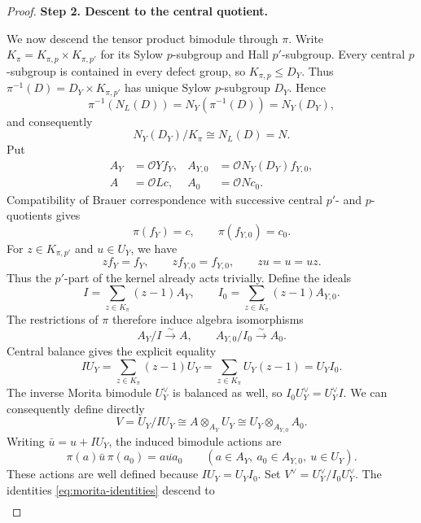 \documentclass[11pt,a4paper]{article}
\theoremstyle{definition}
\theoremstyle{remark}
\numberwithin{equation}{section}
\newcommand{\cO}{\mathcal{O}}
\newcommand{\proofstep}[1]{%
	\par\addvspace{\medskipamount}%
	\noindent\textbf{#1}\par\nobreak
	\smallskip\nobreak\noindent\ignorespaces
}
\begin{document}
\begin{proof}
		\proofstep{Step 2. Descent to the central quotient.}
		We now descend the tensor product bimodule through $\pi$.
		Write $K_\pi=K_{\pi,p}\times K_{\pi,p'}$ for its Sylow
		$p$-subgroup and Hall $p'$-subgroup. Every central $p$-subgroup
		is contained in every defect group, so $K_{\pi,p}\leq D_Y$.
		Thus $\pi^{-1}(D)=D_Y\times K_{\pi,p'}$ has unique Sylow
		$p$-subgroup $D_Y$. Hence
		\[
		\pi^{-1}(N_L(D))=N_Y(\pi^{-1}(D))=N_Y(D_Y),
		\]
		and consequently
		\begin{equation}\label{eq:product-normalizer}
			N_Y(D_Y)/K_\pi\cong N_L(D)=N.
		\end{equation}
		Put
		\[
		\begin{aligned}
			A_Y&=\cO Yf_Y,& A_{Y,0}&=\cO N_Y(D_Y)f_{Y,0},\\
			A&=\cO Lc,& A_0&=\cO Nc_0.
		\end{aligned}
		\]
		Compatibility of Brauer correspondence with successive central $p'$- and $p$-quotients \cite[Theorems~9.9(c) and~9.10]{Navarro1998} gives
		\[
		\pi(f_Y)=c,\qquad \pi(f_{Y,0})=c_0.
		\]
		For $z\in K_{\pi,p'}$ and $u\in U_Y$, we have
		\[
		zf_Y=f_Y,\qquad zf_{Y,0}=f_{Y,0},\qquad zu=u=uz.
		\]
		Thus the $p'$-part of the kernel already acts trivially.
		Define the ideals
		\[
		I=\sum_{z\in K_\pi}(z-1)A_Y,\qquad
		I_0=\sum_{z\in K_\pi}(z-1)A_{Y,0}.
		\]
		The restrictions of $\pi$ therefore induce algebra isomorphisms
		\begin{equation}\label{eq:central-quotient-algebras}
			A_Y/I\xrightarrow{\sim}A,\qquad
			A_{Y,0}/I_0\xrightarrow{\sim}A_0.
		\end{equation}
		Central balance gives the explicit equality
		\[
		IU_Y=\sum_{z\in K_\pi}(z-1)U_Y
		=\sum_{z\in K_\pi}U_Y(z-1)=U_Y I_0.
		\]
		The inverse Morita bimodule $U_Y^\vee$ is balanced as well, so
		$I_0 U_Y^\vee=U_Y^\vee I$. We can consequently define directly
		\begin{equation}\label{eq:central-quotient-bimodule}
			V=U_Y/IU_Y
			\cong A\otimes_{A_Y}U_Y
			\cong U_Y\otimes_{A_{Y,0}}A_0.
		\end{equation}
		Writing $\bar u=u+IU_Y$, the induced bimodule actions are
		\begin{equation}\label{eq:central-quotient-action}
			\pi(a)\bar u\,\pi(a_0)=\overline{au a_0}
			\qquad(a\in A_Y,\ a_0\in A_{Y,0},\ u\in U_Y).
		\end{equation}
		These actions are well defined because $IU_Y=U_Y I_0$.
		Set $V^\vee=U_Y^\vee/I_0 U_Y^\vee$. The identities
		\eqref{eq:morita-identities} descend to
		\[
		\begin{aligned}

\end{aligned}\]
\end{proof}
\end{document}
